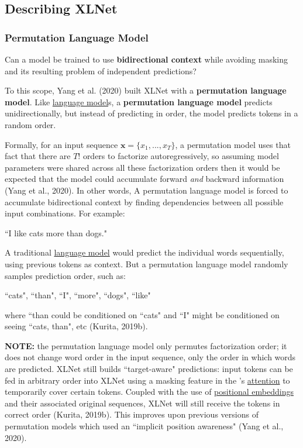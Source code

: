 \subsection{Describing XLNet}


\subsubsection{Permutation Language Model} \label{sec:permutationLM}

Can a model be trained to use \textbf{bidirectional context} while avoiding masking and its resulting problem of independent predictions?

To this scope, Yang et al. (2020) built XLNet with a \textbf{permutation language model}. Like  \hyperref[sec:LanguageModels]{language model}s, a \textbf{permutation language model} predicts unidirectionally, but instead of predicting in order, the model predicts tokens in a random order. 

Formally, for an input sequence $\textbf{x} = \Big\{ x_1,..., x_T \Big\}$, a permutation model uses that fact that there are $T!$ orders to factorize autoregressively, so assuming model parameters were shared across all these factorization orders then it would be expected that the model could accumulate forward \emph{and} backward information (Yang et al., 2020). In other words, A permutation language model is forced to accumulate bidirectional context by finding dependencies between all possible input combinations. For example: 

``I like cats more than dogs." 

A traditional \hyperref[sec:LanguageModels]{language model} would predict the individual words sequentially, using previous tokens as context. But a permutation language model randomly samples prediction order, such as:

``cats", ``than", ``I", ``more", ``dogs", ``like"

where ``than could be conditioned on ``cats" and ``I" might be conditioned on seeing ``cats, than", etc (Kurita, 2019b). 



\textbf{NOTE: } the permutation language model only permutes factorization order; it does not change word order in the input sequence, only the order in which words are predicted. 
XLNet still builds ``target-aware" predictions: input tokens can be fed in arbitrary order into XLNet using a masking feature in the 's \hyperref[sec:AttentionMechanism]{attention} to temporarily cover certain tokens. Coupled with the use of \hyperref[sec:PosEncodings]{positional embeddings} and their associated original sequences, XLNet will still receive the tokens in correct order (Kurita, 2019b). This improves upon previous versions of permutation models which used an ``implicit position awareness" (Yang et al., 2020). 



